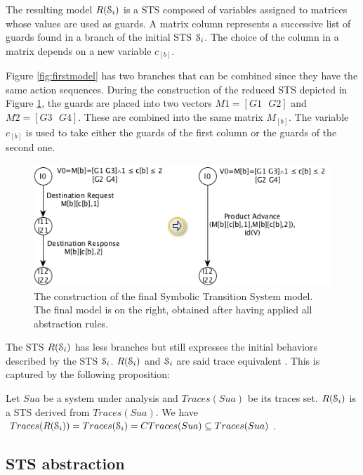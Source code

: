 The resulting model $R(\EuScript{S}_i)$ is a STS composed of
variables assigned to matrices whose values are used as guards. A
matrix column represents a successive list of guards found in a
branch of the initial STS $\EuScript{S}_i$. The choice of the
column in a matrix depends on a new variable $c_{[b]}$.

Figure \ref{fig:firstmodel} has two branches that can be combined
since they have the same action sequences. During the
construction of the reduced STS depicted in Figure
\ref{fig:finalmodel}, the guards are placed into two vectors
$M1=[G1\text{ }G2]$ and $M2=[G3\text{ }G4]$.  These are combined
into the same matrix $M_{[b]}$. The variable $c_{[b]}$ is used to
take either the guards of the first column or the guards of the
second one.

\begin{figure}[ht]
  \includegraphics[width=1.0\linewidth]{figures/STSfinal.png}

    \caption{The construction of the final Symbolic Transition
    System model. The final model is on the right, obtained after
    having applied all abstraction rules.}
	\label{fig:finalmodel}
\end{figure}

The STS $R(\EuScript{S}_i)$ has less branches but still expresses
the initial behaviors described by the STS $\EuScript{S}_i$.
$R(\EuScript{S}_i)$ and $\EuScript{S}_i$ are said trace
equivalent \cite{petrenko06}.  This is captured by the following
proposition:

\begin{proposition}
  Let $\mathit{Sua}$ be a system under analysis and $Traces(Sua)$ be its traces
  set. $R(\EuScript{S}_i)$ is a STS derived from $Traces(Sua)$.
  We have $Traces(R(\EuScript{S}_i)) = Traces(\EuScript{S}_i) =
  CTraces(Sua) \subseteq Traces(Sua)$.
\end{proposition}

\subsection{STS abstraction}

